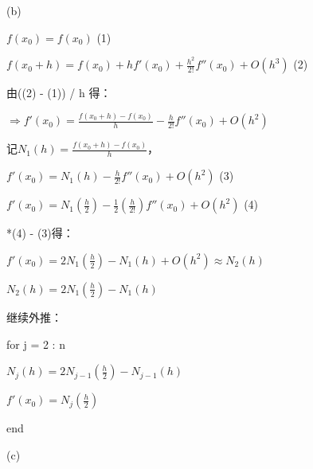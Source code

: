 \documentclass[12pt,a4paper,UTF8]{ctexart}
\begin{document}
\begin{enumerate}
(b)

\qquad $f(x_0) = f(x_0)$ \hfill (1)

\qquad $f(x_0 + h) = f(x_0) + hf'(x_0) + \frac{h^2}{2!} f''(x_0) + O(h^3)$ \hfill (2)

\quad 由((2) - (1)) / h 得：

\quad $\Rightarrow f'(x_0) = \frac{f(x_0 + h) - f(x_0)}{h} - \frac{h}{2!} f''(x_0) + O(h^2)$

\quad 记$N_1(h) = \frac{f(x_0 + h) - f(x_0)}{h}$，

\qquad $f'(x_0) = N_1(h) - \frac{h}{2!} f''(x_0) + O(h^2)$ \hfill (3)

\qquad $f'(x_0) = N_1(\frac{h}{2}) - \frac{1}{2}(\frac{h}{2!}) f''(x_0) + O(h^2)$ \hfill (4)

*(4) - (3)得：

\qquad $f'(x_0) = 2N_1(\frac{h}{2}) - N_1(h) + O(h^2) \approx N_2(h)$

\qquad $N_2(h) = 2N_1(\frac{h}{2}) - N_1(h)$

\quad 继续外推：

for j = 2 : n

\qquad $N_j(h) = 2N_{j-1}(\frac{h}{2}) - N_{j-1}(h)$ 

\qquad $f'(x_0) = N_j(\frac{h}{2})$

end

(c)


\end{enumerate}
\end{document}
